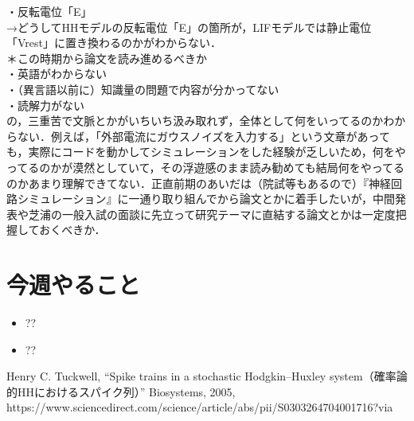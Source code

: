 \documentclass[dvipdfmx, A4j, twocolumn, 10.5pt]{jsarticle}
\begin{document}
・反転電位「E」\\

→どうしてHHモデルの反転電位「E」の箇所が，LIFモデルでは静止電位「Vrest」に置き換わるのかがわからない．\\

＊この時期から論文を読み進めるべきか \\

・英語がわからない \\

・（異言語以前に）知識量の問題で内容が分かってない \\

・読解力がない \\

の，三重苦で文脈とかがいちいち汲み取れず，全体として何をいってるのかわからない．例えば，「外部電流にガウスノイズを入力する」という文章があっても，実際にコードを動かしてシミュレーションをした経験が乏しいため，何をやってるのかが漠然としていて，その浮遊感のまま読み勧めても結局何をやってるのかあまり理解できてない．正直前期のあいだは（院試等もあるので）『神経回路シミュレーション』に一通り取り組んでから論文とかに着手したいが，中間発表や芝浦の一般入試の面談に先立って研究テーマに直結する論文とかは一定度把握しておくべきか．






\section{今週やること}
\begin{itemize}
 \item ??
 \item ??
\end{itemize}




\begin{thebibliography}{99}
 Henry C. Tuckwell, ``Spike trains in a stochastic Hodgkin–Huxley system（確率論的HHにおけるスパイク列）'' Biosystems, 2005, https://www.sciencedirect.com/science/article/abs/pii/S0303264704001716?via%
\end{thebibliography}
\end{document}
